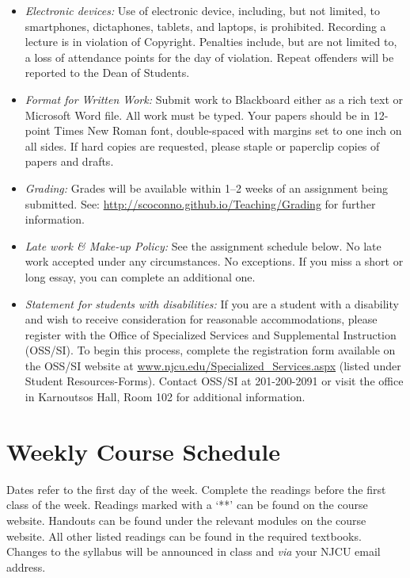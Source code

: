 \documentclass[article,oneside]{memoir}
\begin{document}
\begin{itemize}
\item \textit{Electronic devices:} Use of electronic device, including, but not limited, to smartphones, dictaphones, tablets, and laptops, is prohibited. Recording a lecture is in violation of Copyright. Penalties include, but are not limited to, a loss of attendance points for the day of violation. Repeat offenders will be reported to the Dean of Students.

\item \textit{Format for Written Work:} Submit work to Blackboard either as a rich text or Microsoft Word file. All work must be typed. Your papers should be in 12-point Times New Roman font, double-spaced with margins set to one inch on all sides. If hard copies are requested, please staple or paperclip copies of papers and drafts.



\item \textit{Grading:} Grades will be available within 1--2 weeks of an assignment being submitted. See: \href{http://scoconno.github.io/Teaching/Grading}{http://scoconno.github.io/Teaching/Grading} for further information.


\item \textit{Late work \& Make-up Policy:} See the assignment schedule below. No late work accepted under any circumstances. No exceptions. If you miss a short or long essay, you can complete an additional one. 

\item \textit{Statement for students with disabilities:} If you are a student with a disability and wish to receive consideration for reasonable accommodations, please register with the Office of Specialized Services and Supplemental Instruction (OSS/SI). To begin this process, complete the registration form available on the OSS/SI website at
\href{http://www.njcu.edu/Specialized_Services.aspx}{www.njcu.edu/Specialized\_Services.aspx}
(listed under Student Resources-Forms). Contact OSS/SI at 201-200-2091
or visit the office in Karnoutsos Hall, Room 102 for additional
information.

\end{itemize}



\section{Weekly Course Schedule}
Dates refer to the first day of the week. Complete the readings before the first class of the week. Readings marked with a `**' can be found on the course website. Handouts can be found under the relevant modules on the course website. All other listed readings can be found in the required textbooks. Changes to the syllabus will be announced in class and \emph{via} your NJCU email address.
\end{document}
